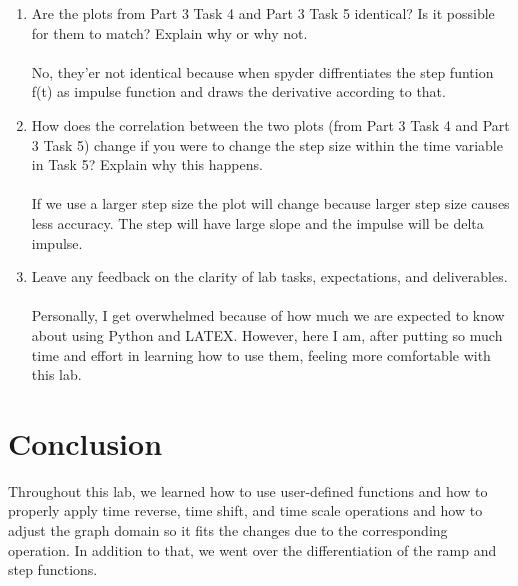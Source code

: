 \documentclass[11pt,a4]{Lab2 Report}
\begin{document}
	\begin{enumerate}
		\item 
		Are the plots from Part 3 Task 4 and Part 3 Task 5 identical? Is it possible for them to match? Explain why or why not.\\
		\\No, they'er not identical because when spyder diffrentiates the step funtion f(t) as impulse function and draws the derivative according to that.\\
		
		\item
		How does the correlation between the two plots (from Part 3 Task 4 and Part 3 Task 5) change if you were to change the step size within the time variable in Task 5? Explain why this happens.\\
		\\If we use a larger step size the plot will change because larger step size causes less accuracy. The step will have large slope and the impulse will be delta impulse.\\
		
		\item
		Leave any feedback on the clarity of lab tasks, expectations, and deliverables.\\
		\\Personally, I get overwhelmed because of how much we are expected to know about using Python and LATEX. However, here I am, after putting so much time and effort in learning how to use them, feeling more comfortable with this lab.
	\end{enumerate}
	
	\section{Conclusion}
	
	Throughout this lab, we learned how to use  user-defined functions and how to properly apply time reverse, time shift, and time scale operations and how to adjust the graph domain so it fits the changes due to the corresponding operation. In addition to that, we went over the differentiation of the ramp and step functions.
	
\end{document}
